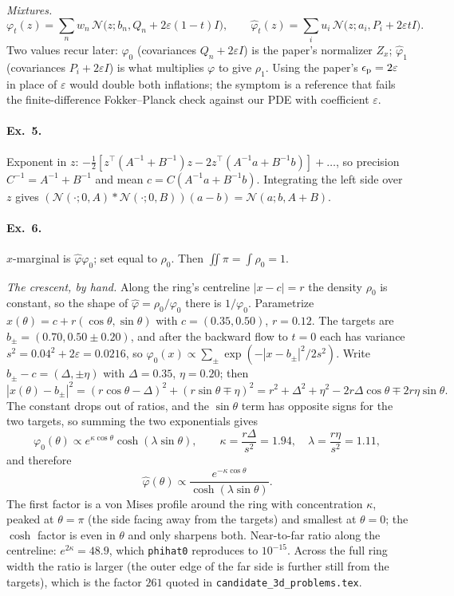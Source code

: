\documentclass[11pt]{article}
\newcommand{\eps}{\varepsilon}
\newcommand{\code}[1]{\texttt{#1}}
\newcommand{\Nc}{\mathcal{N}}
\newcommand{\hphi}{\hat\varphi}
\newcounter{ex}
\begin{document}
\emph{Mixtures.}
\[
  \varphi_t(z)=\sum_nw_n\,\Nc\big(z;b_n,Q_n+2\eps(1-t)I\big),\qquad
  \hphi_t(z)=\sum_iu_i\,\Nc\big(z;a_i,P_i+2\eps tI\big).
\]
Two values recur later: $\varphi_0$ (covariances $Q_n+2\eps I$) is the paper's normalizer
$Z_x$; $\hphi_1$ (covariances $P_i+2\eps I$) is what multiplies $\varphi$ to give $\rho_1$.
Using the paper's $\epsilon_{\rm p}=2\eps$ in place of $\eps$ would double both inflations;
the symptom is a reference that fails the finite-difference Fokker--Planck check against our
PDE with coefficient $\eps$.

\paragraph{Ex.\ 5.} Exponent in $z$: $-\tfrac12[z^\top(A^{-1}+B^{-1})z-2z^\top(A^{-1}a+B^{-1}b)]+\dots$,
so precision $C^{-1}=A^{-1}+B^{-1}$ and mean $c=C(A^{-1}a+B^{-1}b)$. Integrating the left side
over $z$ gives $(\Nc(\cdot;0,A)*\Nc(\cdot;0,B))(a-b)=\Nc(a;b,A+B)$.

\paragraph{Ex.\ 6.} $x$-marginal is $\hphi\varphi_0$; set equal to $\rho_0$. Then
$\iint\pi=\int\rho_0=1$.

\emph{The crescent, by hand.} Along the ring's centreline $|x-c|=r$ the density $\rho_0$ is
constant, so the shape of $\hphi=\rho_0/\varphi_0$ there is $1/\varphi_0$. Parametrize
$x(\theta)=c+r(\cos\theta,\sin\theta)$ with $c=(0.35,0.50)$, $r=0.12$. The targets are
$b_\pm=(0.70,0.50\pm0.20)$, and after the backward flow to $t=0$ each has variance
$s^2=0.04^2+2\eps=0.0216$, so $\varphi_0(x)\propto\sum_\pm\exp(-|x-b_\pm|^2/2s^2)$. Write
$b_\pm-c=(\Delta,\pm\eta)$ with $\Delta=0.35$, $\eta=0.20$; then
\[
  |x(\theta)-b_\pm|^2=(r\cos\theta-\Delta)^2+(r\sin\theta\mp\eta)^2
  =r^2+\Delta^2+\eta^2-2r\Delta\cos\theta\mp2r\eta\sin\theta .
\]
The constant drops out of ratios, and the $\sin\theta$ term has opposite signs for the two
targets, so summing the two exponentials gives
\[
  \varphi_0(\theta)\propto e^{\kappa\cos\theta}\cosh(\lambda\sin\theta),\qquad
  \kappa=\frac{r\Delta}{s^2}=1.94,\quad \lambda=\frac{r\eta}{s^2}=1.11,
\]
and therefore
\[
  \hphi(\theta)\propto\frac{e^{-\kappa\cos\theta}}{\cosh(\lambda\sin\theta)} .
\]
The first factor is a von Mises profile around the ring with concentration $\kappa$, peaked
at $\theta=\pi$ (the side facing away from the targets) and smallest at $\theta=0$; the
$\cosh$ factor is even in $\theta$ and only sharpens both. Near-to-far ratio along the
centreline: $e^{2\kappa}=48.9$, which \code{phihat0} reproduces to $10^{-15}$. Across the full
ring width the ratio is larger (the outer edge of the far side is further still from the
targets), which is the factor $261$ quoted in \code{candidate\_3d\_problems.tex}.
\end{document}
